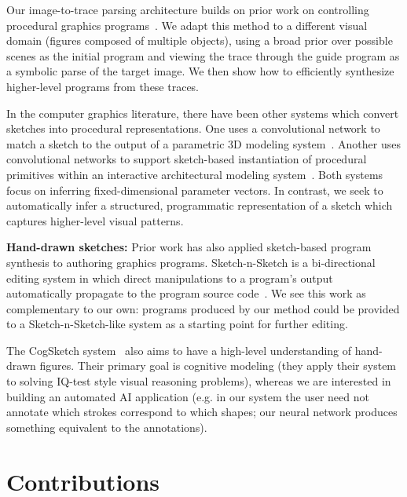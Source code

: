 \documentclass{article}
\theoremstyle{definition}
\begin{document}
\begin{table}[h]
Our image-to-trace parsing architecture builds on prior work on controlling procedural graphics programs~\citep{ritchie2016neurally}.
We adapt this method to a different visual domain (figures composed of multiple objects), using a broad prior over possible scenes as the initial program and viewing the trace through the guide program as a symbolic parse of the target image.
We then show how to efficiently synthesize higher-level programs from these traces.

In the computer graphics literature, there have been other systems which convert sketches into procedural representations. One uses a convolutional network to match a sketch to the output of a parametric 3D modeling system~\citep{huang2017shape}. Another uses convolutional networks to support sketch-based instantiation of procedural primitives within an interactive architectural modeling system~\citep{Nishida:2016:ISU:2897824.2925951}. Both systems focus on inferring fixed-dimensional parameter vectors. In contrast, we seek to automatically infer a structured, programmatic representation of a sketch which captures higher-level visual patterns.

\textbf{Hand-drawn sketches:} Prior work has also applied sketch-based program synthesis to authoring graphics programs. Sketch-n-Sketch is a bi-directional editing system in which direct manipulations to a program's output automatically propagate to the program source code~\citep{Hempel:2016:SSP:2984511.2984575}. We see this work as complementary to our own: programs produced by our method could be provided to a Sketch-n-Sketch-like system as a starting point for further editing.

The CogSketch system~\citep{forbus2011cogsketch} also aims to have a high-level understanding of hand-drawn figures. Their primary goal is cognitive modeling (they apply their system to solving IQ-test style visual reasoning problems), whereas we are interested in building an automated AI application (e.g. in our system the user need not annotate which strokes correspond to which shapes; our neural network produces something equivalent to the annotations).

\section{Contributions}


\end{table}
\end{document}
